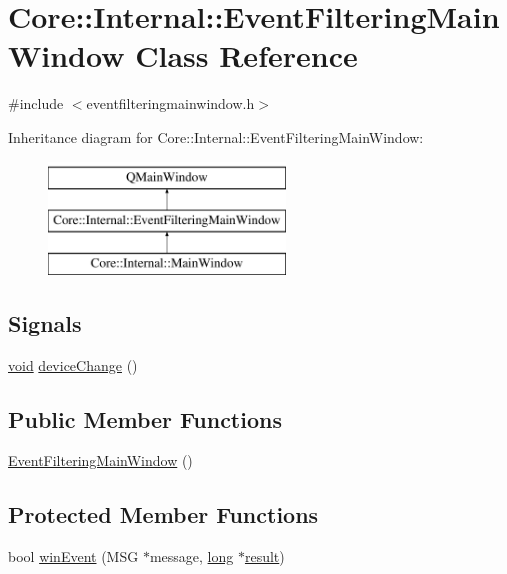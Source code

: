 \hypertarget{class_core_1_1_internal_1_1_event_filtering_main_window}{\section{Core\-:\-:Internal\-:\-:Event\-Filtering\-Main\-Window Class Reference}
\label{class_core_1_1_internal_1_1_event_filtering_main_window}
}


{\ttfamily \#include $<$eventfilteringmainwindow.\-h$>$}

Inheritance diagram for Core\-:\-:Internal\-:\-:Event\-Filtering\-Main\-Window\-:\begin{figure}[H]
\begin{center}
\leavevmode
\includegraphics[height=3.000000cm]{class_core_1_1_internal_1_1_event_filtering_main_window}
\end{center}
\end{figure}
\subsection*{Signals}
\begin{DoxyCompactItemize}
\item 
\hyperlink{group___u_a_v_objects_plugin_ga444cf2ff3f0ecbe028adce838d373f5c}{void} \hyperlink{group___core_plugin_gac3fc413fc8a7712489a7f06887f72474}{device\-Change} ()
\end{DoxyCompactItemize}
\subsection*{Public Member Functions}
\begin{DoxyCompactItemize}
\item 
\hyperlink{group___core_plugin_gae292d853eb38e063bbf621e7895b45c9}{Event\-Filtering\-Main\-Window} ()
\end{DoxyCompactItemize}
\subsection*{Protected Member Functions}
\begin{DoxyCompactItemize}
\item 
bool \hyperlink{group___core_plugin_ga67c2e3c1e5955cc0ae7f4225ec54b57f}{win\-Event} (M\-S\-G $\ast$message, \hyperlink{ioapi_8h_a3c7b35ad9dab18b8310343c201f7b27e}{long} $\ast$\hyperlink{qxtslotjob_8h_aab161efab0511ea9612b64c40e9852ca}{result})
\end{DoxyCompactItemize}


